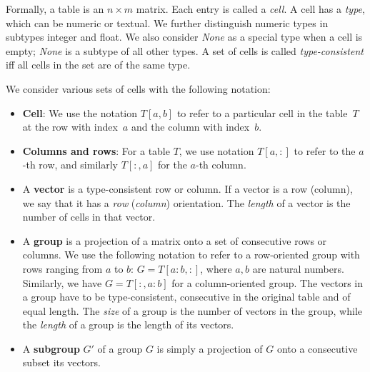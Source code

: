 \documentclass{sig-alternate-05-2015}
\newcommand{\groups}{\ensuremath{\mathcal{G}}\xspace}
\begin{document}
Formally, a table is an $n \times m$ matrix. Each entry is called a \textit{cell}.
A cell has a {\em type}, which can be numeric or textual. We further distinguish numeric types in subtypes integer and float. We also consider \textit{None} as a special type when a cell is empty; \textit{None} is a subtype of all other types.
A set of cells is called \textit{type-consistent} iff all cells in the set are of the same type.

We consider various sets of cells with the following notation:
\begin{itemize}
  \item {\bf Cell}: We use the notation $T[a,b]$ to refer to a particular cell in the table~$T$ at the row with index~$a$ and the column with index~$b$.

  \item {\bf Columns and rows}: For a table $T$, we use notation $T[a,{:}]$ to refer to the $a$-th row, and similarly $T[{:},a]$ for the $a$-th column. %

  \item
  A \textbf{vector} is a type-consistent row or column.
  If a vector is a row (column), we say that it has a \textit{row} (\textit{column}) orientation. The \textit{length} of a vector is the number of cells in that vector.

  \item
  A \textbf{group} is a projection of a matrix onto a set of consecutive rows or columns. %
  We use the following notation to refer to a row-oriented group with rows ranging from $a$ to $b$: $G = T[a{:}b,:]$, where $a,b$ are natural numbers. Similarly, we have $G = T[{:},a{:}b]$ for a column-oriented group.
  The vectors in a group have to be type-consistent, consecutive in the original table and of equal length.
  The \textit{size} of a group is the number of vectors in the group, while the \textit{length} of a group is the length of its vectors. 

  \item
  A \textbf{subgroup} $G'$ of a group $G$ is simply a projection of $G$ onto a consecutive subset its vectors. %
\end{itemize}
\end{document}
